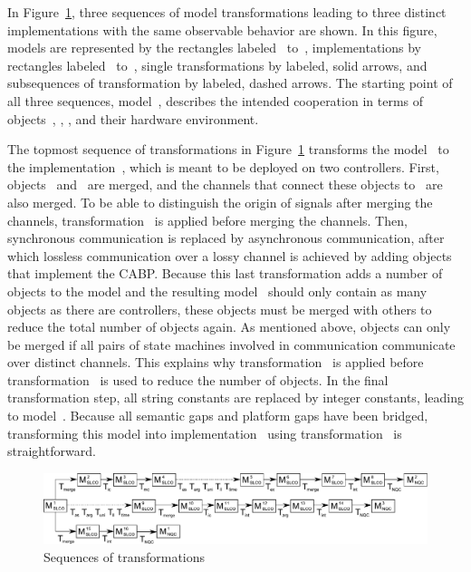 In Figure~\ref{fig:TransformationSequences}, three sequences of model transformations leading to three distinct implementations with the same observable behavior are shown.
In this figure, \SLCO models are represented by the rectangles labeled~ to~, \NQC implementations by rectangles labeled~ to~, single transformations by labeled, solid arrows, and subsequences of transformation by labeled, dashed arrows.
The starting point of all three sequences, model~, describes the intended cooperation in terms of objects~, , , and their hardware environment.

The topmost sequence of transformations in Figure~\ref{fig:TransformationSequences} transforms the \SLCO model~ to the \NQC implementation~, which is meant to be deployed on two controllers.
First, objects~ and~ are merged, and the channels that connect these objects to~ are also merged.
To be able to distinguish the origin of signals after merging the channels, transformation~ is applied before merging the channels.
Then, synchronous communication is replaced by asynchronous communication, after which lossless communication over a lossy channel is achieved by adding objects that implement the CABP.
Because this last transformation adds a number of objects to the model and the resulting model~ should only contain as many objects as there are controllers, these objects must be merged with others to reduce the total number of objects again.
As mentioned above, objects can only be merged if all pairs of state machines involved in communication communicate over distinct channels.
This explains why transformation~ is applied before transformation~ is used to reduce the number of objects.
In the final transformation step, all string constants are replaced by integer constants, leading to model~.
Because all semantic gaps and platform gaps have been bridged, transforming this model into implementation~ using transformation~ is straightforward.

\begin{figure}[hbt]
 \centering
 \includegraphics[scale=0.52]{slco/figs/transformations/sequences}
 \caption{Sequences of transformations}
 \label{fig:TransformationSequences}
\end{figure}

